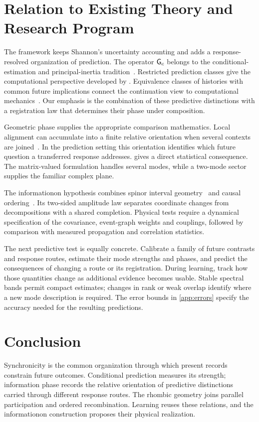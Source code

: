 \section{Relation to Existing Theory and Research Program}
\label{sec:discussion}
The framework keeps Shannon's uncertainty accounting and adds a response-resolved organization of prediction. The operator \(\mathsf G_c\) belongs to the conditional-estimation and principal-inertia tradition~\citep{calmon2017}. Restricted prediction classes give the computational perspective developed by \citet{xu2020}. Equivalence classes of histories with common future implications connect the continuation view to computational mechanics~\citep{shalizi2001}. Our emphasis is the combination of these predictive distinctions with a registration law that determines their phase under composition.

Geometric phase supplies the appropriate comparison mathematics. Local alignment can accumulate into a finite relative orientation when several contexts are joined~\citep{pancharatnam1956,berry1984,simon1983}. In the prediction setting this orientation identifies which future question a transferred response addresses.  gives a direct statistical consequence. The matrix-valued formulation handles several modes, while a two-mode sector supplies the familiar complex plane.

The informationon hypothesis combines spinor interval geometry~\citep{penrose1960} and causal ordering~\citep{surya2019}. Its two-sided amplitude law separates coordinate changes from decompositions with a shared completion. Physical tests require a dynamical specification of the covariance, event-graph weights and couplings, followed by comparison with measured propagation and correlation statistics.

The next predictive test is equally concrete. Calibrate a family of future contrasts and response routes, estimate their mode strengths and phases, and predict the consequences of changing a route or its registration. During learning, track how those quantities change as additional evidence becomes usable. Stable spectral bands permit compact estimates; changes in rank or weak overlap identify where a new mode description is required. The error bounds in \cref{app:errors} specify the accuracy needed for the resulting predictions.

\section{Conclusion}
Synchronicity is the common organization through which present records constrain future outcomes. Conditional prediction measures its strength; information phase records the relative orientation of predictive distinctions carried through different response routes. The rhombic geometry joins parallel participation and ordered recombination. Learning reuses these relations, and the informationon construction proposes their physical realization.
